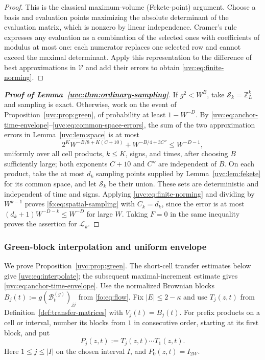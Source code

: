 \documentclass[11pt]{article}
\numberwithin{equation}{section}
\theoremstyle{remark}
\newcommand{\Z}{\mathbb Z}
\newcommand{\cL}{\mathcal L}
\begin{document}
\begin{proof}
This is the classical maximum-volume (Fekete-point) argument.
Choose a basis and evaluation points maximizing the absolute determinant
of the evaluation matrix, which is nonzero by linear independence.
Cramer's rule expresses any evaluation as a combination of the selected
ones with coefficients of modulus at most one: each numerator replaces
one selected row and cannot exceed the maximal determinant.
Apply this representation to the difference of best approximations in
$\mathcal V$ and add their errors to obtain \eqref{uvc:eq:finite-norming}.
\end{proof}

\begin{proof}[\textbf{Proof of Lemma~\ref{uvc:thm:ordinary-sampling}}]
If $g^2<W^B$, take $\mathcal S_k=\Z_L^k$ and sampling is exact.
Otherwise, work on the event of Proposition~\ref{uvc:prop:green}, of
probability at least $1-W^{-D}$. By
\eqref{uvc:eq:anchor-time-envelope}--\eqref{uvc:eq:common-space-errors},
the sum of the two approximation errors in Lemma~\ref{uvc:lem:space}
is at most
\[
 2^K W^{-B/8+K(C+10)}+W^{-B/4+3C''}\le W^{-D-1},
\]
uniformly over all cell products, $k\le K$, signs, and times, after
choosing $B$ sufficiently large; both exponents $C+10$ and $C''$ are
independent of $B$.
On each product, take the at most $d_k$ sampling points supplied by
Lemma~\ref{uvc:lem:fekete} for its common space, and let $\mathcal S_k$
be their union. These sets are deterministic and independent of time
and signs. Applying \eqref{uvc:eq:finite-norming} and dividing by
$W^{k-1}$ proves \eqref{fo:eq:spatial-sampling} with $C_k=d_k$,
since the error is at most $(d_k+1)W^{-D-k}\le W^{-D}$ for large $W$.
Taking $F=0$ in the same inequality proves the assertion for $\cL_k$.
\end{proof}

\subsubsection{Green-block interpolation and uniform envelope}
\label{sec:green-interpolation-proof}
We prove Proposition~\ref{uvc:prop:green}. The short-cell transfer
estimates below give \eqref{uvc:eq:interpolate}; the subsequent
maximal-increment estimate gives \eqref{uvc:eq:anchor-time-envelope}.
Use the normalized Brownian blocks
$B_j(t):=g(\mathcal B_t^{(g)})_{jj}$ from \eqref{fo:eq:flow}.
Fix $|E|\le2-\kappa$ and use $T_j(z,t)$ from
Definition~\ref{def:transfer-matrices}
with $V_j(t)=B_j(t)$. For prefix products on a cell or interval,
number its blocks from $1$ in consecutive order, starting at its
first block, and put
\[
 P_j(z,t):=T_j(z,t)\cdots T_1(z,t).
\]
Here $1\le j\le |I|$ on the chosen interval $I$, and
$P_0(z,t)=I_{2W}$.
\end{document}
